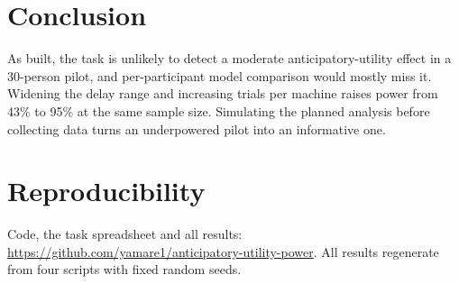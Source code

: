 \documentclass[10pt,twocolumn]{article}
\begin{document}
\section{Conclusion}

As built, the task is unlikely to detect a moderate anticipatory-utility effect
in a 30-person pilot, and per-participant model comparison would mostly miss it.
Widening the delay range and increasing trials per machine raises power from
43\% to 95\% at the same sample size. Simulating the planned analysis before
collecting data turns an underpowered pilot into an informative one.

\section*{Reproducibility}

Code, the task spreadsheet and all results:
\url{https://github.com/yamare1/anticipatory-utility-power}. All results
regenerate from four scripts with fixed random seeds.


\end{document}
